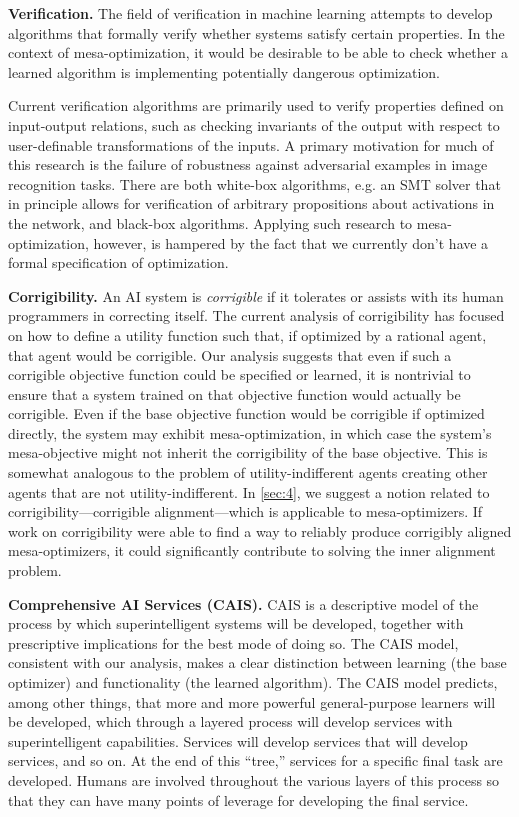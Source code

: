 \documentclass[
  onecolumn,
  natbib,
]{miri-tech-article}
\begin{document}
\textbf{Verification.} The field of verification in machine learning attempts to develop algorithms that formally verify whether systems satisfy certain properties. In the context of mesa-optimization, it would be desirable to be able to check whether a learned algorithm is implementing potentially dangerous optimization.

Current verification algorithms are primarily used to verify properties defined on input-output relations, such as checking invariants of the output with respect to user-definable transformations of the inputs. A primary motivation for much of this research is the failure of robustness against adversarial examples in image recognition tasks. There are both white-box algorithms,\cite{safety_verification} e.g. an SMT solver that in principle allows for verification of arbitrary propositions about activations in the network,\cite{reluplex} and black-box algorithms\cite{practical_verification}. Applying such research to mesa-optimization, however, is hampered by the fact that we currently don't have a formal specification of optimization.

\textbf{Corrigibility.} An AI system is \textit{corrigible} if it tolerates or assists with its human programmers in correcting itself.\cite{corrigibility} The current analysis of corrigibility has focused on how to define a utility function such that, if optimized by a rational agent, that agent would be corrigible. Our analysis suggests that even if such a corrigible objective function could be specified or learned, it is nontrivial to ensure that a system trained on that objective function would actually be corrigible. Even if the base objective function would be corrigible if optimized directly, the system may exhibit mesa-optimization, in which case the system's mesa-objective might not inherit the corrigibility of the base objective. This is somewhat analogous to the problem of utility-indifferent agents creating other agents that are not utility-indifferent.\cite{corrigibility} In \cref{sec:4}, we suggest a notion related to corrigibility---corrigible alignment---which is applicable to mesa-optimizers. If work on corrigibility were able to find a way to reliably produce corrigibly aligned mesa-optimizers, it could significantly contribute to solving the inner alignment problem.

\textbf{Comprehensive AI Services (CAIS).}\cite{drexler} CAIS is a descriptive model of the process by which superintelligent systems will be developed, together with prescriptive implications for the best mode of doing so. The CAIS model, consistent with our analysis, makes a clear distinction between learning (the base optimizer) and functionality (the learned algorithm). The CAIS model predicts, among other things, that more and more powerful general-purpose learners will be developed, which through a layered process will develop services with superintelligent capabilities. Services will develop services that will develop services, and so on. At the end of this ``tree,'' services for a specific final task are developed. Humans are involved throughout the various layers of this process so that they can have many points of leverage for developing the final service.
\end{document}
